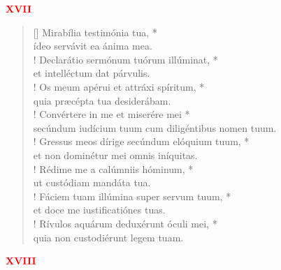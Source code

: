 


\def\greinitialformat#1{%
{\fontsize{39}{39}\selectfont #1}%
}




\vspace{0.3cm}
\begin{center}
 \textcolor{red}{\bf XVII}
\end{center}
\begin{verse}[\versewidth]
Mirabília testimónia tua, *\\
ídeo servávit ea ánima mea.\\!
\vin Declarátio sermónum tuórum illúminat, *\\
\vin et intelléctum dat párvulis.\\!
Os meum apérui et attráxi spíritum, *\\
quia præcépta tua desiderábam.\\!
\vin Convértere in me et miserére mei *\\
\vin secúndum iudícium tuum cum diligéntibus nomen tuum.\\!
Gressus meos dírige secúndum elóquium tuum, *\\
et non dominétur mei omnis iníquitas.\\!
\vin Rédime me a calúmniis hóminum, *\\
\vin ut custódiam mandáta tua.\\!
Fáciem tuam illúmina super servum tuum, *\\
et doce me iustificatiónes tuas.\\!
\vin Rívulos aquárum deduxérunt óculi mei, *\\
\vin quia non custodiérunt legem tuam.\\
\end{verse}
\begin{center}
\textcolor{red}{\bf XVIII}\\
\end{center}
